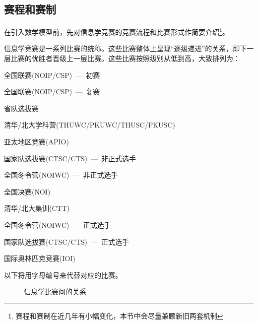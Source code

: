     \subsection{赛程和赛制}

        在引入数学模型前，先对信息学竞赛的竞赛流程和比赛形式作简要介绍\footnote{赛程和赛制在近几年有小幅变化，本节中会尽量兼顾新旧两套机制}。

        信息学竞赛是一系列比赛的统称。这些比赛整体上呈现“逐级递进”的关系，即下一层比赛的优胜者晋级上一层比赛。这些比赛按照级别从低到高，大致排列为：

        \begin{asparaenum}[a.]
            \item 全国联赛(NOIP/CSP)\ ---\ 初赛 
            \item 全国联赛(NOIP/CSP)\ ---\ 复赛
            \item 省队选拔赛
            \item 清华/北大学科营(THUWC/PKUWC/THUSC/PKUSC)
            \item 亚太地区竞赛(APIO)
            \item 国家队选拔赛(CTSC/CTS)\ ---\ 非正式选手
            \item 全国冬令营(NOIWC)\ ---\ 非正式选手
            \item 全国决赛(NOI)
            \item 清华/北大集训(CTT)
            \item 全国冬令营(NOIWC)\ ---\ 正式选手
            \item 国家队选拔赛(CTSC/CTS)\ ---\ 正式选手
            \item 国际奥林匹克竞赛(IOI)
        \end{asparaenum}
        
        以下将用字母编号来代替对应的比赛。

        \begin{figure}[hb]
            \centering
            \caption{信息学比赛间的关系}
            \label{fig:contests}
        \end{figure}

